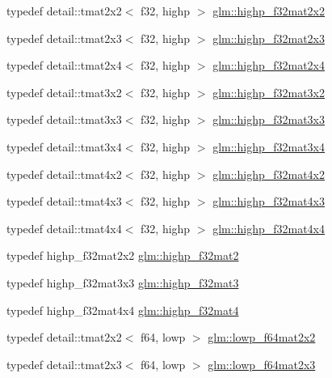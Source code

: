 \begin{DoxyCompactItemize}
\item 
typedef detail\+::tmat2x2$<$ f32, highp $>$ \hyperlink{group__gtc__type__precision_gaf3a2cc948ca6fd168391138ce6fdd100}{glm\+::highp\+\_\+f32mat2x2}
\item 
typedef detail\+::tmat2x3$<$ f32, highp $>$ \hyperlink{group__gtc__type__precision_ga53613c1b93f81207065a8a935ff02a81}{glm\+::highp\+\_\+f32mat2x3}
\item 
typedef detail\+::tmat2x4$<$ f32, highp $>$ \hyperlink{group__gtc__type__precision_ga9689dbe21bc976ca8069c63300b5887e}{glm\+::highp\+\_\+f32mat2x4}
\item 
typedef detail\+::tmat3x2$<$ f32, highp $>$ \hyperlink{group__gtc__type__precision_gaf36b2b34ea881977c61491b0d3b25a28}{glm\+::highp\+\_\+f32mat3x2}
\item 
typedef detail\+::tmat3x3$<$ f32, highp $>$ \hyperlink{group__gtc__type__precision_ga334eca23d23aef90972fb20c5b749ca3}{glm\+::highp\+\_\+f32mat3x3}
\item 
typedef detail\+::tmat3x4$<$ f32, highp $>$ \hyperlink{group__gtc__type__precision_gaa71f504ecb02f9178026b01013b77ba0}{glm\+::highp\+\_\+f32mat3x4}
\item 
typedef detail\+::tmat4x2$<$ f32, highp $>$ \hyperlink{group__gtc__type__precision_ga4d799497b303c2434fe709f81f6bd4dd}{glm\+::highp\+\_\+f32mat4x2}
\item 
typedef detail\+::tmat4x3$<$ f32, highp $>$ \hyperlink{group__gtc__type__precision_ga5bd692575886422f501a379386e391d9}{glm\+::highp\+\_\+f32mat4x3}
\item 
typedef detail\+::tmat4x4$<$ f32, highp $>$ \hyperlink{group__gtc__type__precision_gafe24f12e4f5453058caea3f583ad7d9c}{glm\+::highp\+\_\+f32mat4x4}
\item 
typedef highp\+\_\+f32mat2x2 \hyperlink{group__gtc__type__precision_gaed934f561aaf8ad891c0a8f5e719aea8}{glm\+::highp\+\_\+f32mat2}
\item 
typedef highp\+\_\+f32mat3x3 \hyperlink{group__gtc__type__precision_ga06809818db73785334f839742a9ad85a}{glm\+::highp\+\_\+f32mat3}
\item 
typedef highp\+\_\+f32mat4x4 \hyperlink{group__gtc__type__precision_gac14c1bfb647e39d459c7489ede2156cc}{glm\+::highp\+\_\+f32mat4}
\item 
typedef detail\+::tmat2x2$<$ f64, lowp $>$ \hyperlink{group__gtc__type__precision_ga38e41c5332b4eb20b23b4ed1f06608d4}{glm\+::lowp\+\_\+f64mat2x2}
\item 
typedef detail\+::tmat2x3$<$ f64, lowp $>$ \hyperlink{group__gtc__type__precision_ga2add7d48faba102f53fbad2e14dfed12}{glm\+::lowp\+\_\+f64mat2x3}

\end{DoxyCompactItemize}
